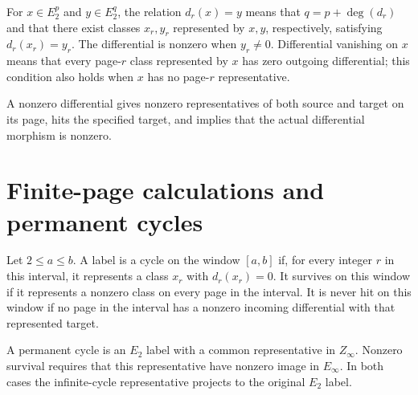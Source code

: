 \begin{definition}
\label{sem:SpectralSequence:differential}
For $x\in E_2^p$ and $y\in E_2^q$, the relation $d_r(x)=y$ means that $q=p+\deg(d_r)$ and that there exist classes $x_r,y_r$ represented by $x,y$, respectively, satisfying $d_r(x_r)=y_r$. The differential is nonzero when $y_r\neq0$. Differential vanishing on $x$ means that every page-$r$ class represented by $x$ has zero outgoing differential; this condition also holds when $x$ has no page-$r$ representative.
\end{definition}

\begin{theorem}
\label{sem:SpectralSequence:nonzero-differential}
A nonzero differential gives nonzero representatives of both source and target on its page, hits the specified target, and implies that the actual differential morphism is nonzero.
\end{theorem}

\section{Finite-page calculations and permanent cycles}

\begin{definition}
\label{sem:SpectralSequence:windows}
Let $2\leq a\leq b$. A label is a cycle on the window $[a,b]$ if, for every integer $r$ in this interval, it represents a class $x_r$ with $d_r(x_r)=0$. It survives on this window if it represents a nonzero class on every page in the interval. It is never hit on this window if no page in the interval has a nonzero incoming differential with that represented target.
\end{definition}

\begin{definition}
\label{sem:SpectralSequence:permanent}
A permanent cycle is an $E_2$ label with a common representative in $Z_\infty$. Nonzero survival requires that this representative have nonzero image in $E_\infty$. In both cases the infinite-cycle representative projects to the original $E_2$ label.
\end{definition}

